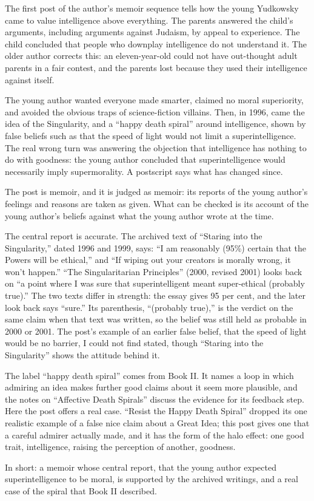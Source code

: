 \begin{afterword}
\summaryhead

The first post of the author's memoir sequence tells how the young Yudkowsky came to value intelligence above everything. The parents answered the child's arguments, including arguments against Judaism, by appeal to experience. The child concluded that people who downplay intelligence do not understand it. The older author corrects this: an eleven-year-old could not have out-thought adult parents in a fair contest, and the parents lost because they used their intelligence against itself.

The young author wanted everyone made smarter, claimed no moral superiority, and avoided the obvious traps of science-fiction villains. Then, in 1996, came the idea of the Singularity, and a ``happy death spiral'' around intelligence, shown by false beliefs such as that the speed of light would not limit a superintelligence. The real wrong turn was answering the objection that intelligence has nothing to do with goodness: the young author concluded that superintelligence would necessarily imply supermorality. A postscript says what has changed since.

\responsehead

The post is memoir, and it is judged as memoir: its reports of the young author's feelings and reasons are taken as given. What can be checked is its account of the young author's beliefs against what the young author wrote at the time.

The central report is accurate. The archived text of ``Staring into the Singularity,'' dated 1996 and 1999, says: ``I am reasonably (95\%) certain that the Powers will be ethical,'' and ``If wiping out your creators is morally wrong, it won't happen.'' ``The Singularitarian Principles'' (2000, revised 2001) looks back on ``a point where I was sure that superintelligent meant super-ethical (probably true).'' The two texts differ in strength: the essay gives 95 per cent, and the later look back says ``sure.'' Its parenthesis, ``(probably true),'' is the verdict on the same claim when that text was written, so the belief was still held as probable in 2000 or 2001. The post's example of an earlier false belief, that the speed of light would be no barrier, I could not find stated, though ``Staring into the Singularity'' shows the attitude behind it.

The label ``happy death spiral'' comes from Book II. It names a loop in which admiring an idea makes further good claims about it seem more plausible, and the notes on ``Affective Death Spirals'' discuss the evidence for its feedback step. Here the post offers a real case. ``Resist the Happy Death Spiral'' dropped its one realistic example of a false nice claim about a Great Idea; this post gives one that a careful admirer actually made, and it has the form of the halo effect: one good trait, intelligence, raising the perception of another, goodness.

In short: a memoir whose central report, that the young author expected superintelligence to be moral, is supported by the archived writings, and a real case of the spiral that Book II described.
\end{afterword}
